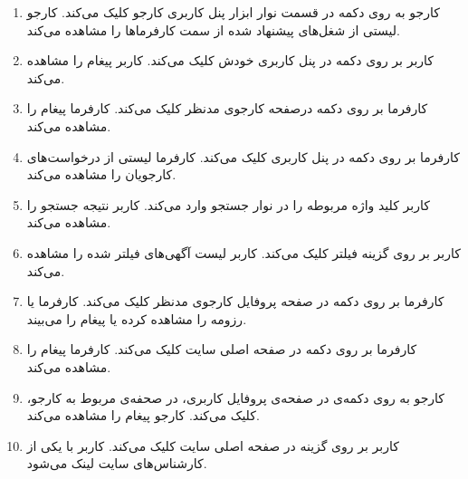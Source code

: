 \begin{enumerate}
	\item[] 
	\tuc		
	{کارجو به روی دکمه‌  در قسمت نوار ابزار پنل کاربری کارجو کلیک می‌کند.}
	{کارجو لیستی از شغل‌های پیشنهاد شده از سمت کارفرماها را مشاهده می‌کند.}
	
	\item[] 
	\tuc				
	{کاربر بر روی دکمه  در پنل کاربری خودش کلیک می‌کند.}
	{کاربر پیغام  را مشاهده می‌کند.}
	
	\item[] 
	\tuc				
	{کارفرما بر روی دکمه  درصفحه کارجوی مدنظر کلیک می‌کند.}
	{کارفرما پیغام  را مشاهده می‌کند.}
	
	\item[] \label{uc:req-manage}
	\tuc				
	{کارفرما بر روی دکمه  در پنل کاربری کلیک می‌کند.}
	{کارفرما لیستی از درخواست‌های کارجویان را مشاهده می‌کند.}
	
	\item[] \label{uc:apply-search}
	\tuc				
	{کاربر کلید واژه مربوطه را در نوار جستجو وارد می‌کند.}
	{کاربر نتیجه جستجو را مشاهده می‌کند.}
	
	\item[] 
	\tuc				
	{کاربر بر روی گزینه فیلتر کلیک می‌کند.}
	{کاربر لیست آگهی‌های فیلتر شده را مشاهده می‌کند.}
	
	\item[] \label{uc:see-resumes}
	\tuc				
	{کارفرما بر روی دکمه  در صفحه پروفایل کارجوی مدنظر کلیک می‌کند.}
	{کارفرما یا رزومه را مشاهده کرده یا پیغام  را می‌بیند.}
	
	\item[] 
	\tuc				
	{کارفرما بر روی دکمه  در صفحه اصلی سایت کلیک می‌کند.}
	{کارفرما پیغام  را مشاهده می‌کند.}
	
	\item[] 
	\tuc				
	{کارجو به روی دکمه‌ی  در صفحه‌ی پروفایل کاربری، در صحفه‌ی مربوط به کارجو، کلیک می‌کند.}
	{کارجو پیغام  را مشاهده می‌کند.}
	
	\item[] 
	\tuc				
	{کاربر بر روی گزینه  در صفحه اصلی سایت کلیک می‌کند.}
	{کاربر با یکی از کارشناس‌های سایت لینک می‌شود.}
	
	\renewcommand{\labelenumi}{\arabic{enumi})}
\end{enumerate}

